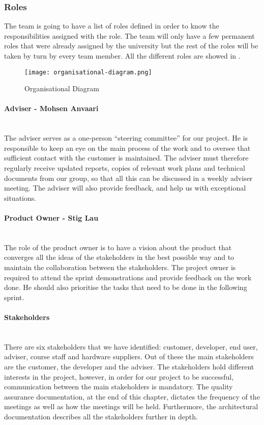 \documentclass[../document.tex]{subfiles}
\begin{document}
\subsubsection{Roles}
The team is going to have a list of roles defined in order to know the responsibilities assigned with the role. The team will only have a few permanent roles that were already assigned by the university but the rest of the roles will be taken by turn by every team member. All the different roles are showed in .
\begin{figure}
\centering
\texttt{[image: organisational-diagram.png]}
\caption{Organisational Diagram}
\label{fig:organisational-diagram}
\end{figure}

\paragraph{Adviser - Mohsen Anvaari} \ \\
The adviser serves as a one-person “steering committee” for our project. He is responsible to keep an eye on the main process of the work and to oversee that sufficient contact with the customer is maintained. The adviser must therefore regularly receive updated reports, copies of relevant work plans and technical documents from our group, so that all this can be discussed in a weekly adviser meeting. The adviser will also provide feedback, and help us with exceptional situations.


\paragraph{Product Owner - Stig Lau} \ \\
The role of the product owner is to have a vision about the product that converges all the ideas of the stakeholders in the best possible way and to maintain the collaboration between the stakeholders. The project owner is required to attend the sprint demonstrations and provide feedback on the work done. He should also prioritise the tasks that need to be done in the following sprint. 

\paragraph{Stakeholders} \ \\
There are six stakeholders that we have identified: customer, developer, end user, adviser, course staff and hardware suppliers. Out of these the main stakeholders are the customer, the developer and the adviser. The stakeholders hold different interests in the project, however, in order for our project to be successful, communication between the main stakeholders is mandatory. The quality assurance documentation, at the end of this chapter, dictates the frequency of the meetings as well as how the meetings will be held. Furthermore, the architectural documentation describes all the stakeholders further in depth.
\end{document}
